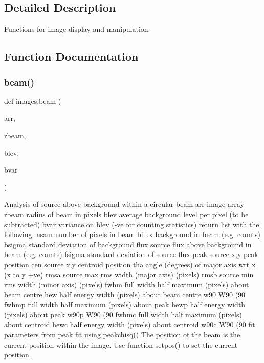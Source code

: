 \subsection{Detailed Description}
Functions for image display and manipulation. 

\subsection{Function Documentation}
\mbox{\label{namespaceimages_a9c1032a597aef7de43c3a8eaa61f9ceb}} 
\subsubsection{\texorpdfstring{beam()}{beam()}}
{\footnotesize\ttfamily def images.\+beam (\begin{DoxyParamCaption}\item[{}]{arr,  }\item[{}]{rbeam,  }\item[{}]{blev,  }\item[{}]{bvar }\end{DoxyParamCaption})}

\begin{DoxyVerb}Analysis of source above background within a circular beam
    arr      image array
    rbeam    radius of beam in pixels
    blev     average background level per pixel (to be subtracted)
    bvar     variance on blev (-ve for counting statistics)
return   list with the following:
    nsam     number of pixels in beam
    bflux    background in beam (e.g. counts)
    bsigma   standard deviation of background
    flux     source flux above background in beam (e.g. counts)
    fsigma   standard deviation of source flux
    peak     source x,y peak position
    cen      source x,y centroid position
    tha      angle (degrees) of major axis wrt x (x to y +ve)
    rmsa     source max rms width (major axis) (pixels)
    rmsb     source min rms width (minor axis) (pixels)
    fwhm     full width half maximum (pixels) about beam centre
    hew      half energy width (pixels) about beam centre
    w90      W90 (90%
    fwhmp    full width half maximum (pixels) about peak
    hewp     half energy width (pixels) about peak
    w90p     W90 (90%
    fwhmc    full width half maximum (pixels) about centroid
    hewc     half energy width (pixels) about centroid
    w90c     W90 (90%
    fit      parameters from peak fit using peakchisq() 
The position of the beam is the current position within the image. Use function setpos() to set the current position.
\end{DoxyVerb}
 \mbox{\label{namespaceimages_af631fb0f1f2077642b9a988d0bff71e7}} 
